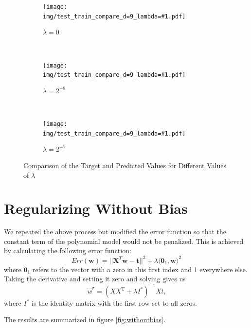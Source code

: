 \documentclass{report}
\newcommand{\wstar}{\vec{w}^{\star}}
\newcommand{\includeLambdaPlot}[3]{  
\begin{subfigure}[t]{#2}
  \centering
  \texttt{[image: img/test\_train\_compare\_d=9\_lambda=\#1.pdf]}
  \caption{$\lambda=#1$}\label{#3}
\end{subfigure}}
\begin{document}
  \begin{figure}[h]
    \centering
    \includeLambdaPlot{0}{0.3\textwidth}{fig:learnedZeroLambda}
    ~ 
    \includeLambdaPlot{2^{-8}}{0.3\textwidth}{fig:learnedTwoPowN8Lambda}
    ~
    \includeLambdaPlot{2^{-7}}{0.3\textwidth}{fig:learnedTwoPowN7Lambda}
    \caption{Comparison of the Target and Predicted Values for Different Values of $\lambda$}\label{fig:learnerTargetAndPredicted}
  \end{figure}

\section{Regularizing Without Bias}
We repeated the above process but modified the error function so that the constant term of the polynomial model would not be penalized. This is achieved by calculating the following error function:
\[ Err(\mathbf{w}) = ||\mathbf{X}^{T} \mathbf{w}-\mathbf{t}||^{2} + \lambda \langle \mathbf{0}_{1}, \mathbf{w} \rangle^{2}\]
where $\mathbf{0}_{1}$ refers to the vector with a zero in this first index and 1 everywhere else. Taking the derivative and setting it zero and solving gives us
\[ \wstar=(XX^{\text{T}} + \lambda I^{*})^{-1}Xt \textrm{,}\]
where $I^{*}$ is the identity matrix with the first row set to all zeros. 

The results are summarized in figure \ref{fig:withoutbias}.
\end{document}
